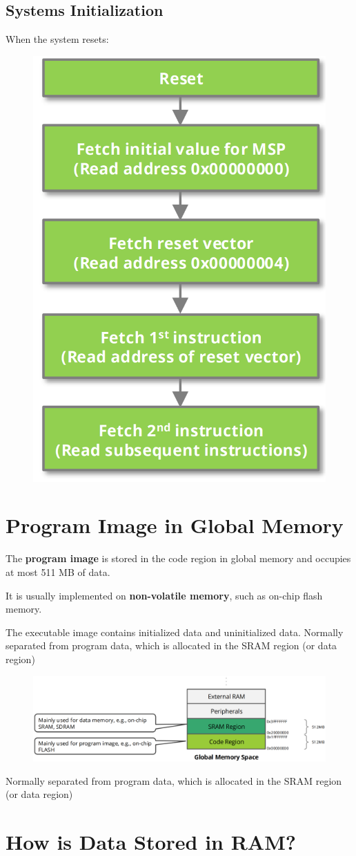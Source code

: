 \subsection{Systems Initialization}

When the system resets:

\begin{figure}[H]
    \centering
    \includegraphics[width=0.23\linewidth]{img/image30.png}
\end{figure}

\section{Program Image in Global Memory}

The \textbf{program image} is stored in the code region in global memory and occupies at most 511 MB of data.

It is usually implemented on \textbf{non-volatile memory}, such as on-chip flash memory.

The executable image contains initialized data and uninitialized data. Normally separated from program data, which is allocated in the SRAM region (or data region)


\begin{figure}[H]
    \centering
    \includegraphics[width=0.8\linewidth]{img/image31.png}
\end{figure}

Normally separated from program data, which is allocated in the SRAM
region (or data region)

\section{How is Data Stored in RAM?}

